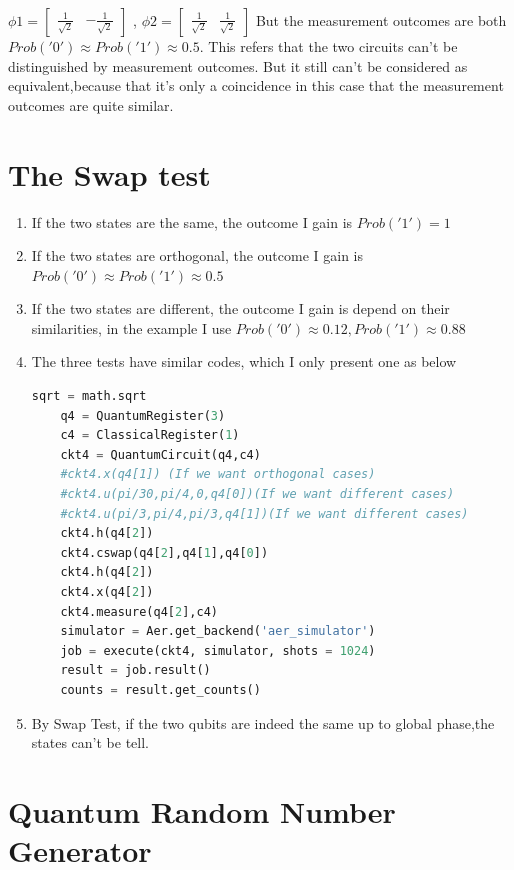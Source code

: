 \documentclass{article}
\begin{document}
\begin{CJK*}{UTF8}{bsmi}
$\phi1 = \begin{bmatrix}
    \frac{1}{\sqrt{2}} & -\frac{1}{\sqrt{2}} 
    \end{bmatrix}$
, $\phi2 = \begin{bmatrix}
    \frac{1}{\sqrt{2}} & \frac{1}{\sqrt{2}} 
    \end{bmatrix}$
But the measurement outcomes are both $Prob('0') \approx Prob('1') \approx 0.5$. This refers that the two circuits can't be distinguished by measurement outcomes.
But it still can't be considered as equivalent,because that it's only a coincidence in this case that the measurement outcomes are quite similar. 
\section{The Swap test}
\begin{enumerate}
    \item If the two states are the same, the outcome I gain is $Prob('1') = 1$
    \item If the two states are orthogonal, the outcome I gain is $Prob('0') \approx
    Prob('1') \approx 0.5$
    \item If the two states are different, the outcome I gain is depend on their similarities, in the example I use $Prob('0') \approx 0.12 ,
    Prob('1') \approx 0.88$
    \item The three tests have similar codes, which I only present one as below
    \begin{lstlisting}[language=Python]
    sqrt = math.sqrt
    q4 = QuantumRegister(3)
    c4 = ClassicalRegister(1)
    ckt4 = QuantumCircuit(q4,c4)
    #ckt4.x(q4[1]) (If we want orthogonal cases)
    #ckt4.u(pi/30,pi/4,0,q4[0])(If we want different cases)
    #ckt4.u(pi/3,pi/4,pi/3,q4[1])(If we want different cases)
    ckt4.h(q4[2])
    ckt4.cswap(q4[2],q4[1],q4[0])
    ckt4.h(q4[2])
    ckt4.x(q4[2])
    ckt4.measure(q4[2],c4)
    simulator = Aer.get_backend('aer_simulator')
    job = execute(ckt4, simulator, shots = 1024)
    result = job.result()
    counts = result.get_counts()
    \end{lstlisting}
    \item By Swap Test, if the two qubits are indeed the same up to global phase,the states can't be tell.
    
\end{enumerate}
\section{ Quantum Random Number Generator}

\end{CJK*}
\end{document}
